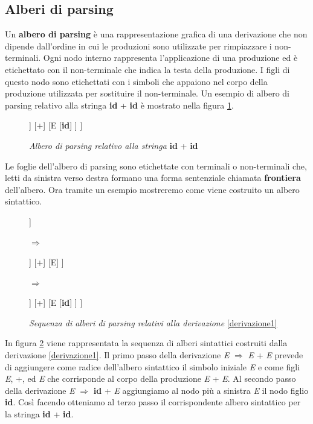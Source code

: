 \subsection{Alberi di parsing}
Un \textbf{albero di parsing} è \cite{libro: compilatori} una rappresentazione grafica di una derivazione che non dipende dall'ordine in cui le produzioni sono utilizzate per rimpiazzare i non-terminali. Ogni nodo interno rappresenta l'applicazione di una produzione ed è etichettato con il non-terminale che indica la testa della  produzione. I figli di questo nodo sono etichettati con i simboli che appaiono nel corpo della produzione utilizzata per sostituire il non-terminale. Un esempio di albero di parsing relativo alla stringa \textbf{id }+\textbf{ id} è mostrato nella figura \ref{fig:albero}.
\begin{figure}[hbpb]
	\centering
	\begin{forest}
		[E
		  [E
		  [\textbf{id}]
		  ]
		  [+]
		  [E
		  [\textbf{id}]
		  ]
		]
	\end{forest}
	\caption{\textit{Albero di parsing relativo alla stringa} \textbf{id} + \textbf{id} }\label{fig:albero}
\end{figure}
Le foglie dell'albero di parsing sono etichettate con terminali o non-terminali che, letti da sinistra verso destra formano una forma sentenziale chiamata \textbf{frontiera} dell'albero. Ora tramite un esempio mostreremo come viene costruito un albero sintattico. \par
\begin{figure}[hbpb]
	\centering
	\begin{forest}
		[E
		[E]
		[+]
		[E]
		]
	\end{forest}
	$\Rightarrow$    
	\begin{forest}
		[E
		[E
		[\textbf{id}]
		]
		[+]
		[E]
		]
	\end{forest}
	$\Rightarrow$    
	\begin{forest}
		[E
		[E
		[\textbf{id}]
		]
		[+]
		[E
		[\textbf{id}]
		]
		]
	\end{forest}
	\caption{\textit{Sequenza di alberi di parsing relativi alla derivazione }\ref{derivazione1}}\label{fig:passiAlbero}
\end{figure}
In figura \ref{fig:passiAlbero} viene rappresentata la sequenza di alberi sintattici costruiti dalla derivazione \ref{derivazione1}. Il primo passo della derivazione \textit{E} $\Rightarrow$ \textit{E} + \textit{E} prevede di aggiungere come radice dell'albero sintattico il simbolo iniziale \textit{E} e come figli \textit{E}, +, ed \textit{E} che corrisponde al corpo della produzione \textit{E} + \textit{E}. Al secondo passo della derivazione \textit{E} $\Rightarrow$ \textbf{id} + \textit{E} aggiungiamo al nodo più a sinistra \textit{E} il nodo figlio \textbf{id}. Così facendo otteniamo al terzo passo il corrispondente albero sintattico per la stringa \textbf{id} + \textbf{id}.
